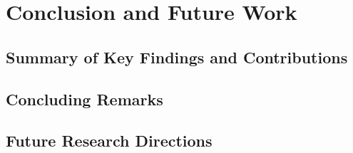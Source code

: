 \chapter{Conclusion and Future Work} %
\label{chap:conclusion}

\section{Summary of Key Findings and Contributions}
\label{sec:conclusion_summary_findings} %

\section{Concluding Remarks}
\label{sec:conclusion_remarks}

\section{Future Research Directions}
\label{sec:conclusion_future_work} %
